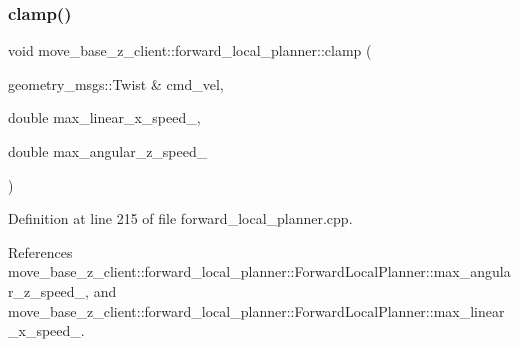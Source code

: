 \subsubsection{\texorpdfstring{clamp()}{clamp()}}
{\footnotesize\ttfamily void move\+\_\+base\+\_\+z\+\_\+client\+::forward\+\_\+local\+\_\+planner\+::clamp (\begin{DoxyParamCaption}\item[{geometry\+\_\+msgs\+::\+Twist \&}]{cmd\+\_\+vel,  }\item[{double}]{max\+\_\+linear\+\_\+x\+\_\+speed\+\_\+,  }\item[{double}]{max\+\_\+angular\+\_\+z\+\_\+speed\+\_\+ }\end{DoxyParamCaption})}



Definition at line 215 of file forward\+\_\+local\+\_\+planner.\+cpp.



References move\+\_\+base\+\_\+z\+\_\+client\+::forward\+\_\+local\+\_\+planner\+::\+Forward\+Local\+Planner\+::max\+\_\+angular\+\_\+z\+\_\+speed\+\_\+, and move\+\_\+base\+\_\+z\+\_\+client\+::forward\+\_\+local\+\_\+planner\+::\+Forward\+Local\+Planner\+::max\+\_\+linear\+\_\+x\+\_\+speed\+\_\+.


